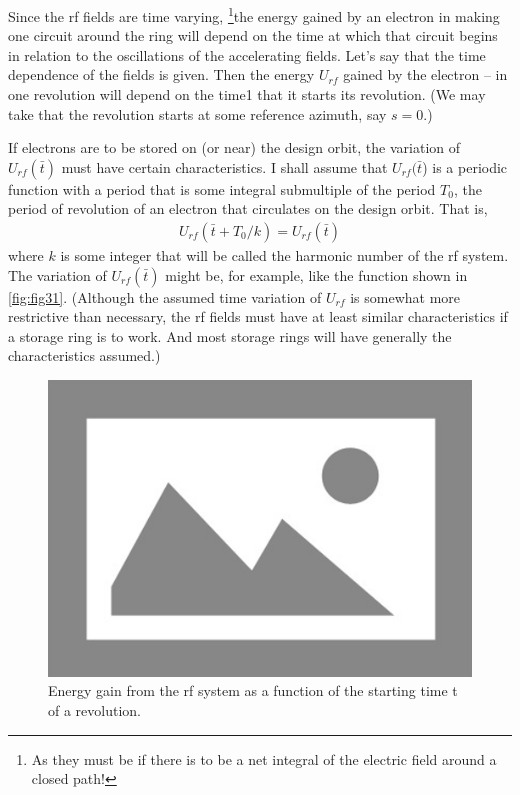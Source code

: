 Since the rf fields are time varying, \footnote{As they must be if there is to be a net integral of the electric field around a closed path!}the energy gained by an electron in making one circuit around the ring will depend on the time at which that circuit begins in relation to the oscillations of the accelerating fields. Let's say that the time dependence of the fields is given. Then the energy $U_{rf}$ gained by the electron -- in one revolution will depend on the time1 that it starts its revolution. (We may take that the revolution starts at some reference azimuth, say $s = 0$.)

If electrons are to be stored on (or near) the design orbit, the variation of $U_{rf}(\bar{t})$ must have certain characteristics. I shall assume that $U_{rf}(\bar{t}$) is a periodic function with a period that is some integral submultiple of the period $T_0$, the period of revolution of an electron that circulates on the design orbit. That is,
\begin{align}
	U_{rf}(\bar{t}+T_0/k) = U_{rf}(\bar{t})\label{eq:3.25}
\end{align}
where $k$ is some integer that will be called the harmonic number of the rf system. The variation of $U_{rf}(\bar{t})$ might be, for example, like the function shown in \autoref{fig:fig31}. (Although the assumed time variation of $U_{rf}$ is somewhat more restrictive than necessary, the rf fields must have at least similar characteristics if a storage ring is to work. And most storage rings will have generally the characteristics assumed.)

\begin{figure}[!htb]
	\centering
	\includegraphics[width=0.85\linewidth]{./Figuras/placeholder.png}
	\caption{Energy gain from the rf system as a function of the starting time t of a revolution.}
	\label{fig:fig31}
\end{figure}

